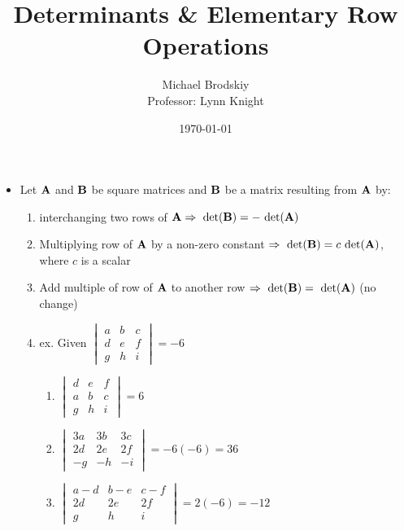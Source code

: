 \documentclass[12pt]{article}
\title{Determinants \& Elementary Row Operations}
\date{\today}
\author{Michael Brodskiy\\ \small Professor: Lynn Knight}
\begin{document}
\maketitle

\begin{itemize}

  \item Let $\bold{A}$ and $\bold{B}$ be square matrices and $\bold{B}$ be a matrix resulting from $\bold{A}$ by:

    \begin{enumerate}

      \item interchanging two rows of $\bold{A}\Rightarrow\text{ det}(\bold{B})=-\text{ det}(\bold{A})$

      \item Multiplying row of $\bold{A}$ by a non-zero constant $\Rightarrow\text{ det}(\bold{B})=c\text{ det}(\bold{A})$, where $c$ is a scalar

      \item Add multiple of row of $\bold{A}$ to another row $\Rightarrow\text{ det}(\bold{B})=\text{ det}(\bold{A})$ (no change)

      \item ex. Given $\begin{vmatrix} a & b & c\\ d & e & f\\ g & h & i \end{vmatrix}=-6$

        \begin{enumerate}

          \item $\begin{vmatrix} d & e & f\\ a & b & c\\ g & h & i \end{vmatrix}=6$

          \item $\begin{vmatrix} 3a & 3b & 3c\\ 2d & 2e & 2f\\ -g & -h & -i \end{vmatrix}=-6(-6)=36$

          \item $\begin{vmatrix} a-d & b-e & c-f\\ 2d & 2e & 2f\\ g & h & i \end{vmatrix}=2(-6)=-12$

        \end{enumerate}

    \end{enumerate}

\end{itemize}
\end{document}

